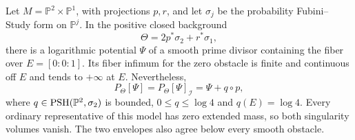 \begin{example}\label{ex:whole-fiber-incidence-envelope}
Let $M=\mathbb P^2\times\mathbb P^1$, with projections $p,r$, and let $\sigma_j$ be the probability Fubini--Study form on $\mathbb P^j$. In the positive closed background
\[
 \Theta=2p^*\sigma_2+r^*\sigma_1,
\]
there is a logarithmic potential $\Psi$ of a smooth prime divisor containing the fiber over $E=[0:0:1]$. Its fiber infimum for the zero obstacle is finite and continuous off $E$ and tends to $+\infty$ at $E$. Nevertheless,
\[
 P_\Theta[\Psi]=P_\Theta[\Psi]_{\mathcal I}=\Psi+q\circ p,
\]
where $q\in\mathrm{PSH}(\mathbb P^2,\sigma_2)$ is bounded, $0\leq q\leq\log4$ and $q(E)=\log4$. Every ordinary representative of this model has zero extended mass, so both singularity volumes vanish. The two envelopes also agree below every smooth obstacle.
\end{example}
